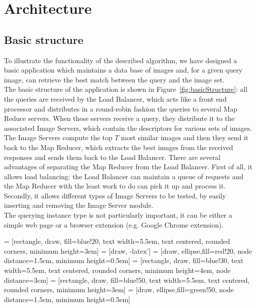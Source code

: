 \chapter{Architecture}
\label{chap:implementation}

\section{Basic structure}

To illustrate the functionality of the described algorithm, we have designed a basic application which maintains a data base of images and, for a given query image, can retrieve the best match between
the query and the image set.\\
The basic structure of the application is shown in Figure~\ref{fig:basicStructure}: all the queries are received by the Load Balancer, which acts like a front end processor and distributes in a round-robin fashion the queries to several Map Reduce servers. When these servers receive a query, they distribute it to the associated Image Servers, which contain the descriptors for various sets of images. The Image Servers compute the top $T$ most similar images and then they send it back to the Map Reducer, which extracts the best images from the received responses and sends them back to the Load Balancer. There are several advantages of separating the Map Reducer from the Load Balancer. First of all, it allows load balancing: the Load Balancer can maintain a queue of requests and the Map Reducer with the least work to do can pick it up and process it. Secondly, it allows different types of Image Servers to be tested, by easily inserting and removing the Image Server module.\\
The querying instance type is not particularly important, it can be either a simple web page or a browser extension (e.g. Google Chrome extension).

 = [rectangle, draw, fill=blue!20, 
    text width=5.5em, text centered, rounded corners, minimum height=3em]
 = [draw, -latex']
 = [draw, ellipse,fill=red!20, node distance=1.5cm,
    minimum height=0.5em]
 = [rectangle, draw, fill=blue!30, 
    text width=5.5em, text centered, rounded corners, minimum height=4em, node distance=3cm]
 = [rectangle, draw, fill=blue!50, 
    text width=5.5em, text centered, rounded corners, minimum height=3em]
 = [draw, ellipse,fill=green!50, node distance=1.5cm,
    minimum height=0.5em]

